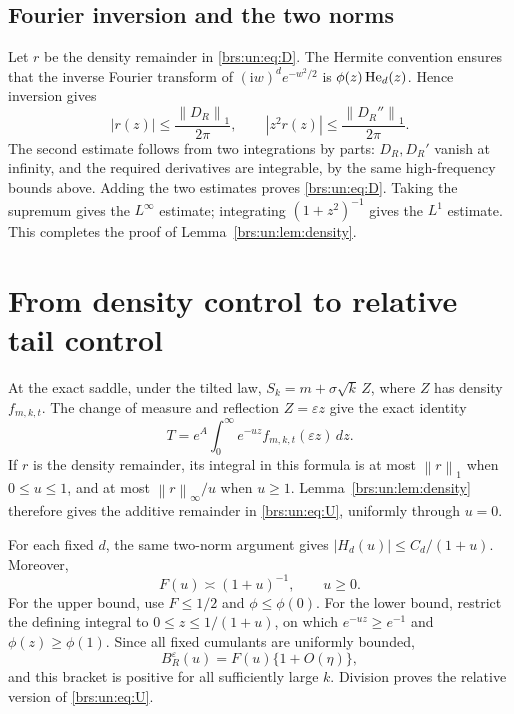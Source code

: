 \documentclass[11pt]{article}
\numberwithin{equation}{section}
\theoremstyle{remark}\newtheorem{remark}[theorem]{Remark}
\newcommand{\ii}{\mathrm i}\newcommand{\sgn}{\operatorname{sgn}}
\newcommand{\norm}[2]{\left\lVert #1\right\rVert_{#2}}
\begin{document}
\subsection{Fourier inversion and the two norms}

Let $r$ be the density remainder in \eqref{brs:un:eq:D}.  The Hermite
convention ensures that the inverse Fourier transform of
$(\ii w)^d e^{-w^2/2}$ is $\phi(z)\operatorname{He}_d(z)$.  Hence inversion gives
\[
 |r(z)|\le\frac{\norm{D_R}{1}}{2\pi},\qquad
 |z^2r(z)|\le\frac{\norm{D_R''}{1}}{2\pi}.
\]
The second estimate follows from two integrations by parts:
$D_R,D_R'$ vanish at infinity, and the required derivatives are
integrable, by the same high-frequency bounds above.  Adding the two
estimates proves \eqref{brs:un:eq:D}.  Taking the supremum gives the
$L^\infty$ estimate; integrating $(1+z^2)^{-1}$ gives the $L^1$
estimate.  This completes the proof of Lemma~\ref{brs:un:lem:density}.

\section{From density control to relative tail control}

At the exact saddle, under the tilted law,
$S_k=m+\sigma\sqrt k\,Z$, where $Z$ has density $f_{m,k,t}$.
The change of measure and reflection $Z=\varepsilon z$ give the
exact identity
\begin{equation}\label{brs:un:eq:esscher}
 T=e^A\int_0^\infty e^{-uz}f_{m,k,t}(\varepsilon z)\,dz.
\end{equation}
If $r$ is the density remainder, its integral in this formula is at
most $\norm r1$ when $0\le u\le1$, and at most
$\norm r\infty/u$ when $u\ge1$.  Lemma~\ref{brs:un:lem:density} therefore
gives the additive remainder in \eqref{brs:un:eq:U}, uniformly through $u=0$.

For each fixed $d$, the same two-norm argument gives
$|H_d(u)|\le C_d/(1+u)$.  Moreover,
\begin{equation}\label{brs:un:eq:Fcompare}
 F(u)\asymp(1+u)^{-1},\qquad u\ge0.
\end{equation}
For the upper bound, use $F\le1/2$ and $\phi\le\phi(0)$.
For the lower bound, restrict the defining integral to
$0\le z\le1/(1+u)$, on which $e^{-uz}\ge e^{-1}$ and
$\phi(z)\ge\phi(1)$.  Since all fixed cumulants are uniformly bounded,
\[
 B_R^\varepsilon(u)=F(u)\{1+O(\eta)\},
\]
and this bracket is positive for all sufficiently large $k$.
Division proves the relative version of \eqref{brs:un:eq:U}.
\end{document}
